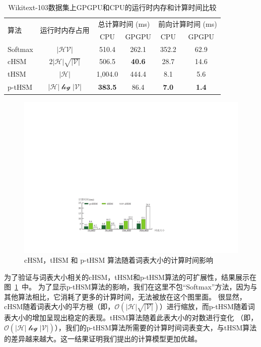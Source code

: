 \begin{table}[!t]
  \centering
  \caption{Wikitext-103数据集上GPGPU和CPU的运行时内存和计算时间比较\label{tab:time}}
\begin{tabular}{lccccc}
  \toprule
 \multirow{2}{*}{算法}  &\multirow{2}{*}{运行时内存占用} &\multicolumn{2}{c}{总计算时间 (ms)} & \multicolumn{2}{c}{前向计算时间 (ms)}   \\
   \cmidrule(lr){3-4}  \cmidrule(lr){5-6}
	& & CPU&GPGPU & CPU& GPGPU \\ \midrule
Softmax & $\mathcal{|HV|}$ &510.4  &262.1&352.2& 62.9 \\
cHSM    & $2\mathcal{|H|\sqrt{|V|}}$&506.5  &\textbf{40.6}&28.7&14.6 \\
tHSM    &$\mathcal{|H|}$&1,004.0 &444.4 & 8.1&  5.6   \\
p-tHSM  &$\mathcal{|H|\log{|V|}}$ &\textbf{383.5}&	86.4 &\textbf{7.0}&	\textbf{1.4} \\
  \bottomrule
\end{tabular}
\end{table}

\begin{figure}[!t]
  \centering
  \includegraphics[width=.87\columnwidth]{./figures/all_time.pdf}
  \caption{cHSM，tHSM 和 p-tHSM 算法随着词表大小的计算时间影响}\label{fig:hsm_benchmark}
\end{figure}


为了验证与词表大小相关的cHSM，tHSM和p-tHSM算法的可扩展性，结果展示在图~\ref{fig:hsm_benchmark}~中。 为了显示p-tHSM算法的影响，我们在这里不包``Softmax''方法，因为与其他算法相比，它消耗了更多的计算时间，无法被放在这个图里面。 很显然，cHSM随着词表大小的平方根（即，$\mathcal{O(|H|\sqrt{|V|})}$）进行缩放，而p-tHSM随着词表大小的增加呈现出稳定的表现。tHSM算法随着此表大小的对数进行变化 （即，$ \mathcal{O(|H|\log{|V|})} $），我们的p-tHSM算法所需要的计算时间词表变大，与tHSM算法的差异越来越大。这一结果证明我们提出的计算模型更加优越。


